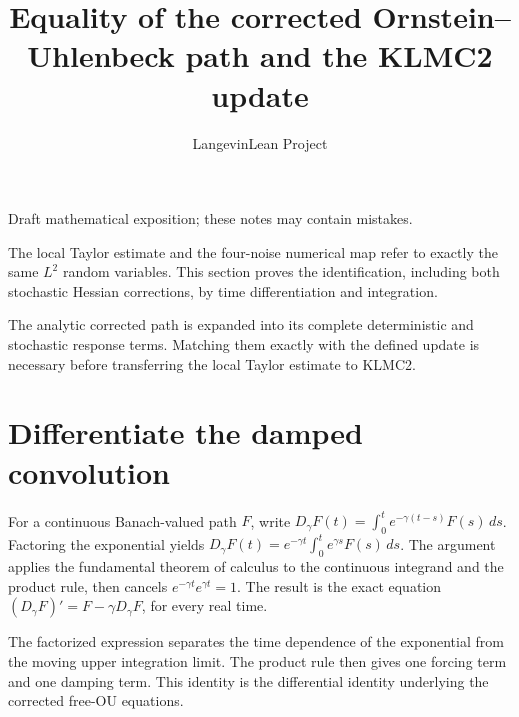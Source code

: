 \documentclass[11pt,a4paper]{article}
\title{\texorpdfstring{Equality of the corrected Ornstein–Uhlenbeck path and the KLMC2 update}{Equality of the corrected Ornstein–Uhlenbeck path and the KLMC2 update}}
\author{LangevinLean Project}
\date{}
\begin{document}
\maketitle
Draft mathematical exposition; these notes may contain mistakes.


The local Taylor estimate and the four-noise numerical map refer to exactly the same \(L^{2}\) random variables. This section proves the identification, including both stochastic Hessian corrections, by time differentiation and integration.



The analytic corrected path is expanded into its complete deterministic and stochastic response terms. Matching them exactly with the defined update is necessary before transferring the local Taylor estimate to KLMC2.


\section{\texorpdfstring{Differentiate the damped convolution}{Differentiate the damped convolution}}


For a continuous Banach-valued path \(F\), write \(D_\gamma F(t)=\int_0^te^{-\gamma(t-s)}F(s)\,ds\). Factoring the exponential yields \(D_\gamma F(t)=e^{-\gamma t}\int_0^te^{\gamma s}F(s)\,ds\). The argument applies the fundamental theorem of calculus to the continuous integrand and the product rule, then cancels \(e^{-\gamma t}e^{\gamma t}=1\). The result is the exact equation \((D_\gamma F)\prime=F-\gamma D_\gamma F\), for every real time.



The factorized expression separates the time dependence of the exponential from the moving upper integration limit. The product rule then gives one forcing term and one damping term. This identity is the differential identity underlying the corrected free-OU equations.
\end{document}

